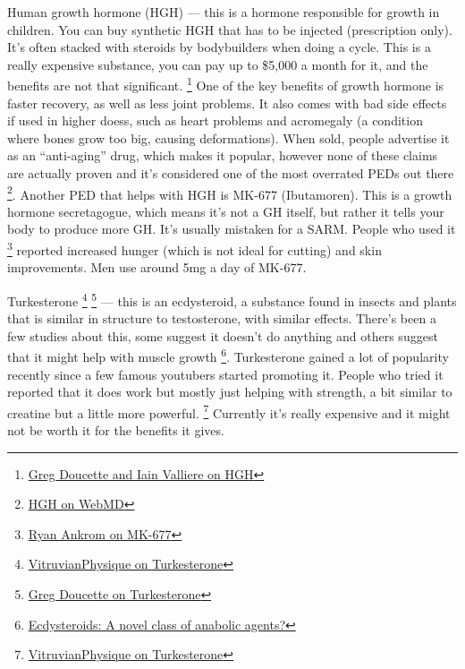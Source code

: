 \documentclass[openany, 12pt]{book}
\begin{document}
        Human growth hormone (HGH) --- this is a hormone responsible for growth in children. You can buy synthetic HGH that has to be injected (prescription only). 
        It's often stacked with steroids by bodybuilders when doing a cycle.
        This is a really expensive substance, you can pay up to \$5,000 a month for it, and the benefits are not that significant.
        \footnote{\href{https://www.youtube.com/watch?v=5F7m8RHf2ZA/}{Greg Doucette and Iain Valliere on HGH}}
        One of the key benefits of growth hormone is faster recovery, as well as less joint problems.
        It also comes with bad side effects if used in higher doess, such as heart problems and acromegaly (a condition where bones grow too big, causing deformations).
        When sold, people advertise it as an ``anti-aging'' drug, which makes it popular, however none of these claims are actually proven and it's considered one of the
        most overrated PEDs out there
        \footnote{\href{https://www.webmd.com/fitness-exercise/human-growth-hormone-hgh}{HGH on WebMD}}. Another PED that helps with HGH is
        MK-677 (Ibutamoren). This is a growth hormone secretagogue, which means it's not a GH itself, but rather it tells your body to produce more GH. It's usually mistaken
        for a SARM. People who used it
        \footnote{\href{https://www.youtube.com/watch?v=sXNnRQh4grU}{Ryan Ankrom on MK-677}}
        reported increased hunger (which is not ideal for cutting) and skin improvements. Men use around 5mg a day of MK-677.

        Turkesterone
        \footnote{\href{https://www.youtube.com/watch?v=zwlHwlOLW9Q}{VitruvianPhysique on Turkesterone}}
        \footnote{\href{https://www.youtube.com/watch?v=T2QKWjEYZqY}{Greg Doucette on Turkesterone}}
        --- this is an ecdysteroid, a substance found in insects and plants that is similar in structure to testosterone, with similar effects. There's been a few studies about this,
        some suggest it doesn't do anything and others suggest that it might help with muscle growth
        \footnote{\href{https://www.ncbi.nlm.nih.gov/pmc/articles/PMC4447764/}{Ecdysteroids: A novel class of anabolic agents?}}.
        Turkesterone gained a lot of popularity recently since a few famous youtubers started promoting it.
        People who tried it reported that it does work but mostly just helping with strength, a bit similar to creatine but a little more powerful.
        \footnote{\href{https://www.youtube.com/watch?v=zwlHwlOLW9Q}{VitruvianPhysique on Turkesterone}}
        Currently it's really expensive and it might not be worth it for the benefits it gives.
\end{document}
